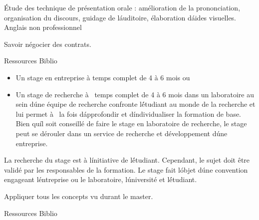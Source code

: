\vfill


{
Étude des technique de présentation orale : amélioration de la prononciation, organisation du discours, guidage de l\'auditoire, élaboration d\'aides visuelles. 
} 
{Anglais non professionnel} 
{\begin{itemize}
\ObjItem Savoir négocier des contrats.
\end{itemize} 
} 
{Ressources} 
{Biblio} 
 
\vfill

{
\begin{itemize}
\item Un stage en entreprise à temps complet de 4 à 6 mois ou
\item Un stage de recherche  à  temps complet de 4 à 6 mois dans un laboratoire au sein d\'une équipe de
recherche confronte l\'étudiant au monde de la recherche et lui permet à  la fois d\'approfondir et d\'individualiser
la formation de base. Bien qu\'il soit conseillé de faire le stage en laboratoire de recherche, le stage peut se dérouler
dans un service de recherche et développement d\'une entreprise.
\end{itemize}
La recherche du stage est à l\'initiative de l\'étudiant.
Cependant, le sujet doit être validé par les responsables de la formation. Le stage fait l\'objet d\'une convention
engageant l\'entreprise ou le laboratoire, l\'université et l\'étudiant.  
} 
{}
{\begin{itemize}
\ObjItem Appliquer tous les concepts vu durant le master.
\end{itemize}
} 
{Ressources} 
{Biblio} 
 
